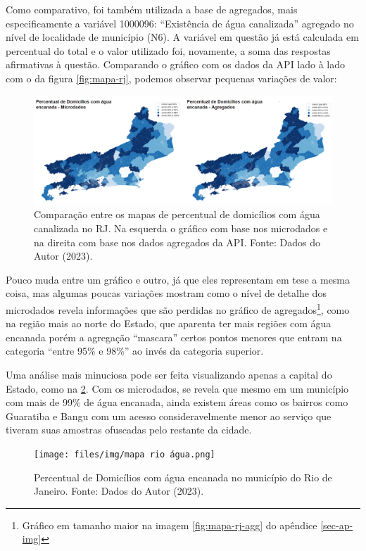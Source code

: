     Como comparativo, foi também utilizada a base de agregados, mais especificamente a variável 1000096: ``Existência de água canalizada'' agregado no nível de localidade de município (N6). A variável em questão já está calculada em percentual do total e o valor utilizado foi, novamente, a soma das respostas afirmativas à questão. Comparando o gráfico com os dados da API lado à lado com o da figura \ref{fig:mapa-rj}, podemos observar pequenas variações de valor:

\begin{figure}[ht]
    \centering
    \includegraphics[width=\textwidth]{files/img/mapa rj agua.png}
    \caption{Comparação entre os mapas de percentual de domicílios com água canalizada no RJ. Na esquerda o gráfico com base nos microdados e na direita com base nos dados agregados da API. Fonte: Dados do Autor (2023).}
    \label{fig:mapa-rj-compara}
\end{figure}

    Pouco muda entre um gráfico e outro, já que eles representam em tese a mesma coisa, mas algumas poucas variações mostram como o nível de detalhe dos microdados revela informações que são perdidas no gráfico de agregados\footnote{Gráfico em tamanho maior na imagem \ref{fig:mapa-rj-agg} do apêndice \ref{sec-ap-img}}, como na região mais ao norte do Estado, que aparenta ter mais regiões com água encanada porém a agregação ``mascara'' certos pontos menores que entram na categoria ``entre 95\% e 98\%'' ao invés da categoria superior.
    
    Uma análise mais minuciosa pode ser feita visualizando apenas a capital do Estado, como na \ref{fig:mapa-mun-rio}. Com os microdados, se revela que mesmo em um município com mais de 99\% de água encanada, ainda existem áreas como os bairros como Guaratiba e Bangu com um acesso consideravelmente menor ao serviço que tiveram suas amostras ofuscadas pelo restante da cidade.

\begin{figure}[ht]
    \centering
    \texttt{[image: files/img/mapa rio água.png]}
    \caption{Percentual de Domicílios com água encanada no município do Rio de Janeiro. Fonte: Dados do Autor (2023).}
    \label{fig:mapa-mun-rio}
\end{figure}
